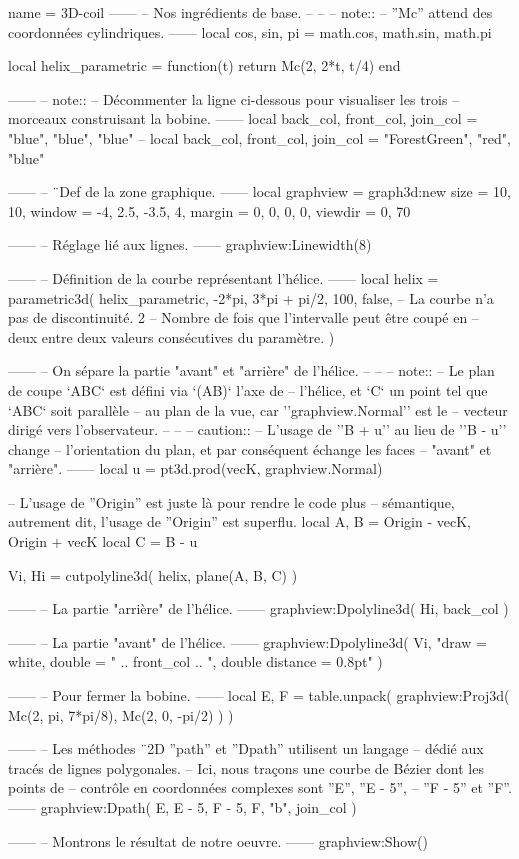 \documentclass[varwidth]{standalone}
\begin{document}
\begin{luadraw}{name = 3D-coil}
------
-- Nos ingrédients de base.
--
--
-- note::
--     ''Mc'' attend des coordonnées cylindriques.
------
local cos, sin, pi = math.cos, math.sin, math.pi

local helix_parametric = function(t)
  return Mc(2, 2*t, t/4)
end

------
-- note::
--     Décommenter la ligne ci-dessous pour visualiser les trois
--     morceaux construisant la bobine.
------
local back_col, front_col, join_col = "blue", "blue", "blue"
-- local back_col, front_col, join_col = "ForestGreen", "red", "blue"

------
-- ¨Def de la zone graphique.
------
local graphview = graph3d:new{
  size    = {10, 10},
  window  = {-4, 2.5, -3.5, 4},
  margin  = {0, 0, 0, 0},
  viewdir = {0, 70}
}

------
-- Réglage lié aux lignes.
------
graphview:Linewidth(8)

------
-- Définition de la courbe représentant l'hélice.
------
local helix = parametric3d(
  helix_parametric,
  -2*pi, 3*pi + pi/2,
  100,
  false,  -- La courbe n'a pas de discontinuité.
  2       -- Nombre de fois que l’intervalle peut être coupé en
          -- deux entre deux valeurs consécutives du paramètre.
)

------
-- On sépare la partie "avant" et "arrière" de l'hélice.
--
--
-- note::
--     Le plan de coupe `ABC` est défini via `(AB)` l'axe de
--     l'hélice, et `C` un point tel que `ABC` soit parallèle
--     au plan de la vue, car ''graphview.Normal'' est le
--     vecteur dirigé vers l'observateur.
--
--
-- caution::
--     L'usage de ''B + u'' au lieu de ''B - u'' change
--     l'orientation du plan, et par conséquent échange les faces
--     "avant" et "arrière".
------
local u = pt3d.prod(vecK, graphview.Normal)

-- L'usage de ''Origin'' est juste là pour rendre le code plus
-- sémantique, autrement dit, l'usage de ''Origin'' est superflu.
local A, B = Origin - vecK, Origin + vecK
local C    = B - u

Vi, Hi = cutpolyline3d(
  helix,
  plane(A, B, C)
)

------
-- La partie "arrière" de l'hélice.
------
graphview:Dpolyline3d(
  Hi,
  back_col
)

------
-- La partie "avant" de l'hélice.
------
graphview:Dpolyline3d(
  Vi,
     "draw = white, double = " .. front_col
  .. ", double distance = 0.8pt"
)

------
-- Pour fermer la bobine.
------
local E, F = table.unpack(
  graphview:Proj3d({
    Mc(2, pi, 7*pi/8),
    Mc(2, 0, -pi/2)
  })
)

------
-- Les méthodes ¨2D ''path'' et ''Dpath'' utilisent un langage
-- dédié aux tracés de lignes polygonales.
-- Ici, nous traçons une courbe de Bézier dont les points de
-- contrôle en coordonnées complexes sont ''E'', ''E - 5'',
-- ''F - 5'' et ''F''.
------
graphview:Dpath(
  {E, E - 5, F - 5, F, "b"},
  join_col
)

------
-- Montrons le résultat de notre oeuvre.
------
graphview:Show()
\end{luadraw}
\end{document}
